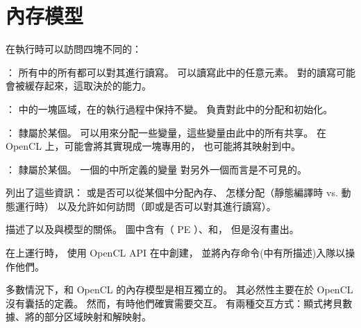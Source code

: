 
\section{內存模型}
在執行時可以訪問四塊不同的：

\startigBase
\item {}：
所有中的所有都可以對其進行讀寫。
可以讀寫此中的任意元素。
對的讀寫可能會被緩存起來，這取決於的能力。

\item {}：
中的一塊區域，在的執行過程中保持不變。
負責對此中的分配和初始化。

\item {}：
隸屬於某個。
可以用來分配一些變量，這些變量由此中的所有共享。
在 OpenCL 上，可能會將其實現成一塊專用的，
也可能將其映射到中。

\item {}：
隸屬於某個。
一個的中所定義的變量
對另外一個而言是不可見的。
\stopigBase

列出了這些資訊：
或是否可以從某個中分配內存、
怎樣分配（靜態編譯時 vs. 動態運行時）
以及允許如何訪問（即或是否可以對其進行讀寫）。


描述了以及與模型的關係。
圖中含有（ PE ）、和，
但是沒有畫出。


{}

在上運行時，
使用 OpenCL API 在中創建，
並將內存命令(中有所描述)入隊以操作他們。

多數情況下，和 OpenCL 的內存模型是相互獨立的。
其必然性主要在於 OpenCL 沒有囊括的定義。
然而，有時他們確實需要交互。
有兩種交互方式：顯式拷貝數據、將的部分区域映射和解映射。

